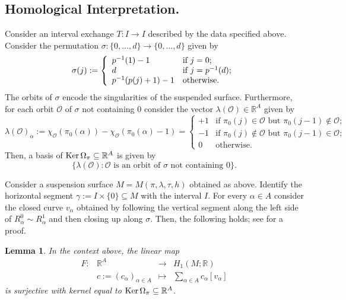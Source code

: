 \documentclass{amsart}
\newtheorem{lemma}[theorem]{Lemma}
\theoremstyle{definition}
\theoremstyle{remark}
\numberwithin{equation}{section}
\newcommand{\<}{{\langle}}
\renewcommand{\>}{{\rangle}}
\newcommand{\field}[1]{\mathbb{#1}}
\newcommand{\R}{\field{R}}
\begin{document}
\subsection{Homological Interpretation.} Consider an interval exchange $T \colon I \to I$ described by the data specified above. Consider the permutation $\sigma \colon \{0,\dots,d\} \to \{0,\dots,d\}$ given by
\[
\sigma(j)  := \left\lbrace \begin{array}{l l}
    p^{-1}(1)-1 & \text{if } j =0; \\
    d & \text{if } j = p^{-1}(d);\\
    p^{-1}(p(j)+1)-1 & \text{otherwise.}
\end{array} \right.
\]
The orbits of $\sigma$ encode the singularities of the suspended surface. Furthermore, for each orbit $\mathcal{O}$ of $\sigma$ not containing $0$ consider the vector $\lambda(\mathcal{O}) \in \R^A$ given by
\[
\lambda(\mathcal{O})_\alpha := \chi_\mathcal{O}(\pi_0(\alpha)) - \chi_\mathcal{O}(\pi_0(\alpha)-1)= \left\lbrace \begin{array}{ll}
    +1 & \text{if $\pi_0(j) \in \mathcal{O}$ but $\pi_0(j-1) \notin \mathcal{O}$}; \\
    -1 & \text{if $\pi_0(j) \notin \mathcal{O}$ but $\pi_0(j-1) \in \mathcal{O}$}; \\
    0 & \text{otherwise}.
\end{array} \right.
\]
Then, a basis of $\mathrm{Ker} \thinspace \Omega_\pi \subseteq \R^A$ is given by
\[
\{\lambda(\mathcal{O}) \colon \mathcal{O} \text{ is an orbit of $\sigma$ not containing $0$}\}.
\]

Consider a suspension surface $M = M(\pi,\lambda,\tau,h)$ obtained as above. Identify the horizontal segment $\gamma := I \times \{0\} \subseteq M$ with the interval $I$. For every $\alpha \in A$ consider the closed curve $v_\alpha$ obtained by following the vertical segment along the left side of $R_\alpha^0 \sim R_\alpha^1$ and then closing up along $\sigma$. Then, the following holds; see \cite{VianaIET} for a proof.

\begin{lemma}
    \label{lemma:hom}
    In the context above, the linear map
    \[
    \begin{array}{cccc}
        F \colon & \R^A &\to & H_1(M;\mathbb{R}) \\
        & c:=(c_\alpha)_{\alpha \in A} &  \mapsto &\sum_{\alpha \in A} c_\alpha[v_\alpha]
    \end{array}
    \]
    is surjective with kernel equal to $\mathrm{Ker} \thinspace \Omega_\pi \subseteq \R^A$.
\end{lemma}
\end{document}
